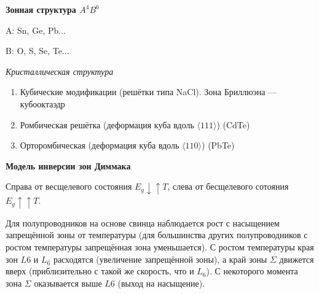 \begin{figure}[h!]
    \centering
\end{figure}


\textbf{Зонная структура $A^4B^6$}

A: Sn, Ge, Pb...

B: O, S, Se, Te...

\textit{Кристаллическая структура}

\begin{enumerate}
    \item Кубические модификации (решётки типа NaCl). Зона Бриллюэна --- кубооктаэдр
    \item Ромбическая решётка (деформация куба вдоль $\langle 111 \rangle$) (CdTe)
    \item Орторомбическая (деформация куба вдоль $\langle 110 \rangle$) (PbTe)
\end{enumerate}


\vspace{2cm}

\begin{figure}[h!]
    \centering
\end{figure}



\vfill

\textbf{Модель инверсии зон Диммака}

\begin{figure}[h!]
    \centering

\end{figure}

\begin{figure}[h!]
    \centering{}
\end{figure}

Справа от весщелевого состояния $E_g \downarrow \uparrow T$, слева от бесщелевого сотояния $E_g \uparrow \uparrow T$.

Для полупроводников на основе свинца наблюдается рост с насыщением запрещённой зоны от температуры (для большинства других полупроводников с ростом температуры запрещённая зона уменьшается). С ростом температуры края зон $L{6}$ и $L_{\bar{6}}$ расходятся (увеличение запрещённой зоны), а край зоны $\Sigma$ движется вверх (приблизительно с такой же скорость, что и $L_6$). С некоторого момента зона $\Sigma$ оказывается выше $L{6}$ (выход на насыщение).

